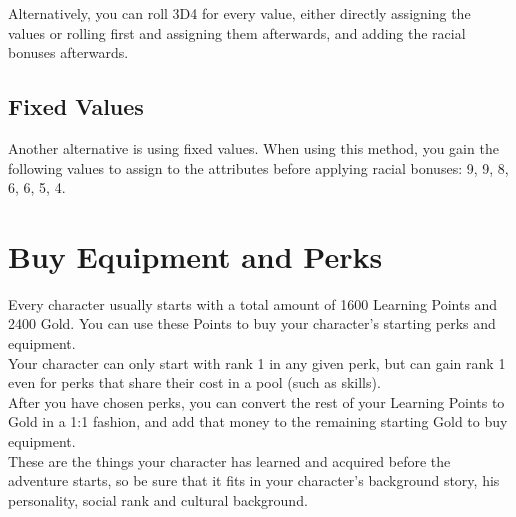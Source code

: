 Alternatively, you can roll 3D4 for every value, either directly assigning the values or rolling first and assigning them afterwards, and adding the racial bonuses afterwards. 


\subsection{Fixed Values}\label{subsec:pointFixed}

Another alternative is using fixed values.
When using this method, you gain the following values to assign to the attributes before applying racial bonuses: 9, 9, 8, 6, 6, 5, 4.


\section{Buy Equipment and Perks}\label{sec:charCreationPerkAndEquip}

Every character usually starts with a total amount of 1600 Learning Points and 2400 Gold.
You can use these Points to buy your character's starting perks and equipment.\\
Your character can only start with rank 1 in any given perk, but can gain rank 1 even for perks that share their cost in a pool (such as skills).\\
After you have chosen perks, you can convert the rest of your Learning Points to Gold in a 1:1 fashion, and add that money to the remaining starting Gold to buy equipment.\\
These are the things your character has learned and acquired before the adventure starts, so be sure that it fits in your character's background story, his personality, social rank and cultural background.\\

